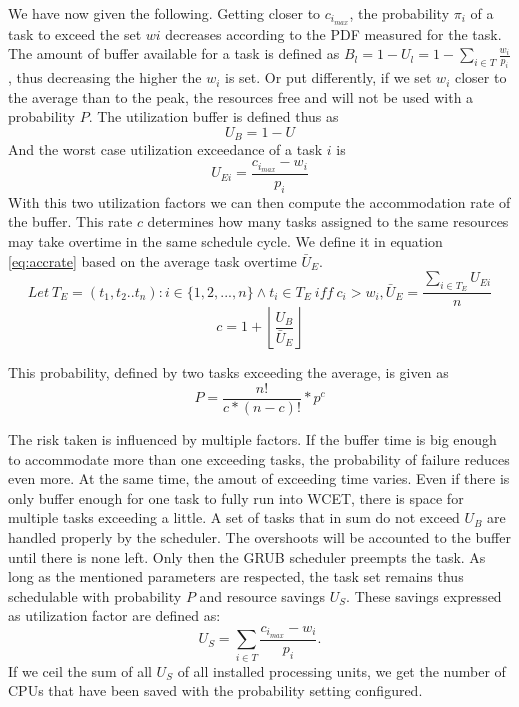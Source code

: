 \documentclass[]{scrartcl}
\begin{document}
We have now given the following.
Getting closer to $c_{i_{max}}$, the probability $\pi_i$ of a task to exceed the set $wi$ decreases according to the PDF measured for the task. 
The amount of buffer available for a task is defined as $B_l = 1 - U_l = 1 - \sum_{i \in T} \frac{w_i}{p_i}$, thus decreasing the higher the $w_i$ is set.
Or put differently, if we set $w_i$ closer to the average than to the peak, the resources free and will not be used with a probability $P$. The utilization buffer is defined thus as 
\begin{equation}
	U_B = 1 - U
\end{equation}
And the worst case utilization exceedance of a task $i$ is 
\begin{equation}
	U_{Ei} = \frac{c_{i_{max}}- w_i}{p_i}
\end{equation}
With this two utilization factors we can then compute the accommodation rate of the buffer. This rate $c$ determines how many tasks assigned to the same resources may take overtime in the same schedule cycle.
We define it in equation \ref{eq:accrate} based on the average task overtime $\bar U_E$.
\begin{equation}
	Let \ T_E = ( t_1, t_2 .. t_n) : i \in \lbrace 1,2,...,n \rbrace \land t_i \in T_E \ iff \ c_i > w_i, 
	\bar U_E = \frac{\sum_{i \in T_E} U_{Ei}}{n}		
\end{equation}
\begin{equation}
	\label{eq:accrate}
	c = 1 + {\left\lfloor \frac{U_B}{\bar U_E} \right\rfloor}
\end{equation}

This probability, defined by two tasks exceeding the average, is given as
\begin{equation}
	P = \frac{n!}{c*(n-c)!} * p^c
\end{equation}

The risk taken is influenced by multiple factors. If the buffer time is big enough to accommodate more than one exceeding tasks, the probability of failure reduces even more.
At the same time, the amout of exceeding time varies. 
Even if there is only buffer enough for one task to fully run into WCET, there is space for multiple tasks exceeding a little.
A set of tasks that in sum do not exceed $U_B$ are handled properly by the scheduler. 
The overshoots will be accounted to the buffer until there is none left. Only then the GRUB scheduler preempts the task.
As long as the mentioned parameters are respected, the task set remains thus schedulable with probability $P$ and resource savings $U_S$.
These savings expressed as utilization factor are defined as:
\begin{equation}
	U_S = \sum_{i \in T} \frac{c_{i_{max}} - w_i}{p_i}.
\end{equation}
If we ceil the sum of all $U_S$ of all installed processing units, we get the number of CPUs that have been saved with the probability setting configured.
\end{document}
